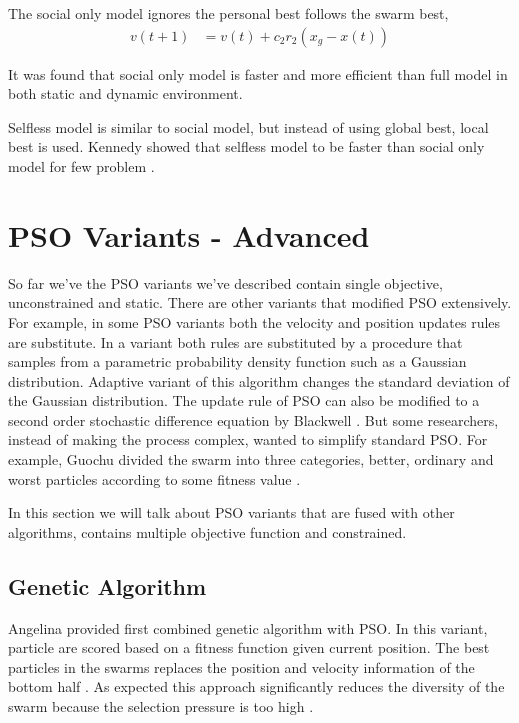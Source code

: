 \documentclass{article}
\begin{document}
The social only model ignores the personal best follows the swarm best,
\begin{align*}
v(t+1) &= v(t) + c_2r_2(x_g - x(t)) 
\end{align*}

It was found that social only model is faster and more efficient than full model in both static and dynamic environment. \cite{kennedy1997particle, carlisle2000adapting}

Selfless model is similar to social model, but instead of using global best, local best is used. Kennedy showed that selfless model to be faster than social only model for few problem \cite{kennedy1997particle}.

\section{PSO Variants - Advanced}
So far we've the PSO variants we've described contain single objective, unconstrained and static. There are other variants that modified PSO extensively. For example, in some PSO variants both the velocity and position updates rules are substitute. In a variant both rules are substituted by a procedure that samples from a parametric probability density function such as a Gaussian distribution. Adaptive variant of this algorithm changes the standard deviation of the Gaussian distribution. The update rule of PSO can also be modified to a second order stochastic difference equation by Blackwell \cite{blackwell2011study}. But some researchers, instead of making the process complex, wanted to simplify standard PSO. For example, Guochu divided the swarm into three categories, better, ordinary and worst particles according to some fitness value \cite{chen2010simplified}.

In this section we will talk about PSO variants that are fused with other algorithms, contains multiple objective function and constrained.

\subsection{Genetic Algorithm}
Angelina provided first combined genetic algorithm with PSO. In this variant, particle are scored based on a fitness function given current position. The best particles in the swarms replaces the position and velocity information of the bottom half \cite{angeline1998using}. As expected this approach significantly reduces the diversity of the swarm because the selection pressure is too high \cite{higashi2003particle}.
\end{document}
